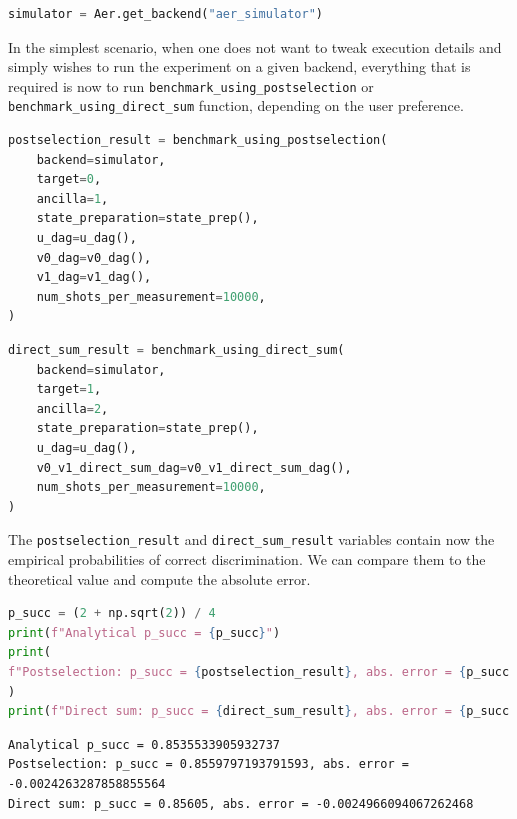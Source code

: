 \documentclass[preprint,12pt, a4paper, dvipsnames]{elsarticle}
\newcommand{\1}{{\rm 1\hspace{-0.9mm}l}}
\theoremstyle{definition}
\begin{document}
\begin{lstlisting}[language=Python, caption=Defining a backend]
simulator = Aer.get_backend("aer_simulator")
\end{lstlisting}

In the simplest scenario, when one does not want to tweak execution details and simply wishes to run
the experiment on a given backend, everything that is required is now to run
\texttt{benchmark\_using\_postselection} or \texttt{benchmark\_using\_direct\_sum} function,
depending on the user preference.

\begin{lstlisting}[language=Python, caption=Simulation benchmark by using postselection]
postselection_result = benchmark_using_postselection(
	backend=simulator,
	target=0,
	ancilla=1,
	state_preparation=state_prep(),
	u_dag=u_dag(),
	v0_dag=v0_dag(),
	v1_dag=v1_dag(),
	num_shots_per_measurement=10000,
)
\end{lstlisting}

\begin{lstlisting}[language=Python, caption=Simulation benchmark by using direct sum]
direct_sum_result = benchmark_using_direct_sum(
	backend=simulator,
	target=1,
	ancilla=2,
	state_preparation=state_prep(),
	u_dag=u_dag(),
	v0_v1_direct_sum_dag=v0_v1_direct_sum_dag(),
	num_shots_per_measurement=10000,
)
\end{lstlisting}
The \texttt{postselection\_result} and  \texttt{direct\_sum\_result} variables contain now the
empirical probabilities of correct discrimination. We can compare them to the theoretical value and
compute the absolute error.

\begin{lstlisting}[language=Python, caption=Examining the benchmark results]
p_succ = (2 + np.sqrt(2)) / 4
print(f"Analytical p_succ = {p_succ}")
print(
f"Postselection: p_succ = {postselection_result}, abs. error = {p_succ - postselection_result}"
)
print(f"Direct sum: p_succ = {direct_sum_result}, abs. error = {p_succ - direct_sum_result}")
\end{lstlisting}

\begin{lstlisting}
Analytical p_succ = 0.8535533905932737
Postselection: p_succ = 0.8559797193791593, abs. error = -0.0024263287858855564
Direct sum: p_succ = 0.85605, abs. error = -0.0024966094067262468
\end{lstlisting}
\end{document}
